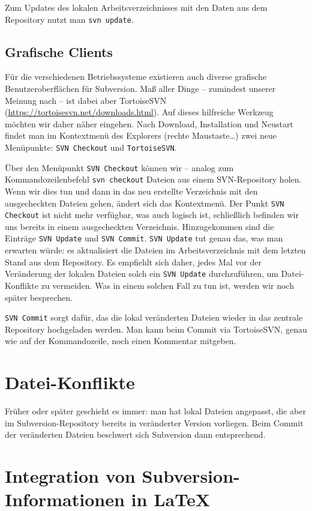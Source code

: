 Zum Updates des lokalen Arbeitsverzeichnisses mit den Daten aus dem Repository nutzt man \texttt{svn update}.

\subsection{Grafische Clients}

Für die verschiedenen Betriebssysteme existieren auch diverse grafische Benutzeroberflächen für Subversion.
Maß aller Dinge -- zumindest unserer Meinung nach -- ist dabei aber TortoiseSVN (\url{https://tortoisesvn.net/downloads.html}). 
Auf dieses hilfreiche Werkzeug möchten wir daher näher eingehen. 
Nach Download, Installation und Neustart findet man im Kontextmenü des Explorers (rechte Maustaste\ldots)  zwei neue Menüpunkte: \texttt{SVN Checkout} und \texttt{TortoiseSVN}.

Über den Menüpunkt \texttt{SVN Checkout} können wir -- analog zum Kommandozeilenbefehl \texttt{svn checkout} Dateien aus einem SVN-Repository holen.
Wenn wir dies tun und dann in das neu erstellte Verzeichnis mit den ausgecheckten Dateien gehen, ändert sich das Kontextmenü. Der Punkt \texttt{SVN Checkout} ist nicht mehr verfügbar, was auch logisch ist, schließlich befinden wir uns bereits in einem ausgecheckten Verzeichnis. Hinzugekommen sind die Einträge \texttt{SVN Update} und \texttt{SVN Commit}. \texttt{SVN Update} tut genau das, was man erwarten würde: es aktualisiert die Dateien im Arbeitsverzeichnis mit dem letzten Stand aus dem Repository. Es empfiehlt sich daher, jedes Mal vor der Veränderung der lokalen Dateien solch ein \texttt{SVN Update} durchzuführen, um Datei-Konflikte zu vermeiden. Was in einem solchen Fall zu tun ist, werden wir noch später besprechen.

\texttt{SVN Commit} sorgt dafür, das die lokal veränderten Dateien wieder in das zentrale Repository hochgeladen werden. Man kann beim Commit via TortoiseSVN, genau wie auf der Kommandozeile, noch einen Kommentar mitgeben.

\section{Datei-Konflikte}

Früher oder später geschieht es immer: man hat lokal Dateien angepasst, die aber im Subversion-Repository bereits in veränderter Version vorliegen. Beim Commit der veränderten Dateien beschwert sich Subversion dann entsprechend.

\section{Integration von Subversion-Informationen in \LaTeX}

